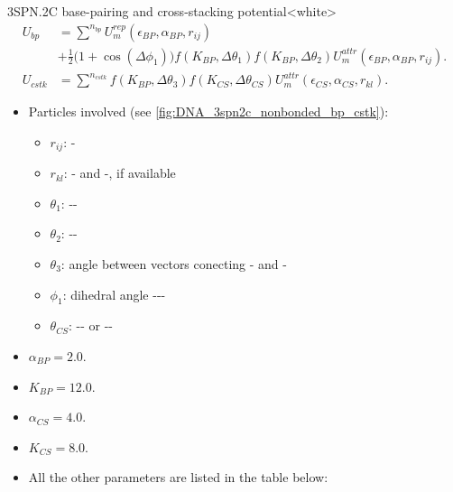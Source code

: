 \begin{smallpage}{3SPN.2C base-pairing and cross-stacking potential}<white>
  \vspace{-1em}
  \begin{align}
    U_{bp} &= \sum^{n_{bp}} U_m^{rep}(\epsilon_{BP}, \alpha_{BP}, r_{ij}) \nonumber \\
           &+ \frac{1}{2} \big( 1+\cos(\Delta \phi_1) \big)
             f(K_{BP}, \Delta\theta_{1})
             f(K_{BP}, \Delta\theta_{2})
             U_m^{attr} (\epsilon_{BP}, \alpha_{BP}, r_{ij}).
             \label{eq:dna_3spn2c_nonlocal_base_pairing} \\[.5em]
    U_{cstk} &= \sum^{n_{cstk}} f(K_{BP}, \Delta\theta_{3})
               f(K_{CS}, \Delta\theta_{CS})
               U_m^{attr} (\epsilon_{CS}, \alpha_{CS}, r_{kl}).
               \label{eq:dna_3spn2c_nonlocal_cross_stacking}
  \end{align}
  \tcblower
  \begin{itemize}
  \item Particles involved (see \autoref{fig:DNA_3spn2c_nonbonded_bp_cstk}):
    \begin{itemize}
    \item $r_{ij}$: -
    \item $r_{kl}$: - and -, if available
    \item $\theta_{1}$: --
    \item $\theta_{2}$: --
    \item $\theta_{3}$: angle between vectors conecting - and -
    \item $\phi_{1}$: dihedral angle ---
    \item $\theta_{CS}$: -- or --
    \end{itemize}
  \item $\alpha_{BP} = 2.0$.
  \item $K_{BP} = 12.0$.
  \item $\alpha_{CS} = 4.0$.
  \item $K_{CS} = 8.0$.
  \item All the other parameters are listed in the table below:
  \end{itemize}
  \begin{center}
    \begin{footnotesize}

\end{footnotesize}
\end{center}
\end{smallpage}
